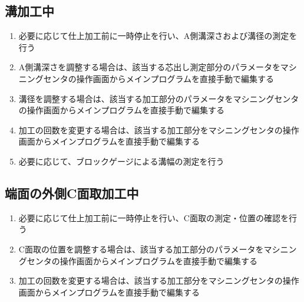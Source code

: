 \subsection{溝加工中}
\begin{enumerate}
\item 必要に応じて仕上加工前に一時停止を行い、A側溝深さおよび溝径の測定を行う
\item A側溝深さを調整する場合は、該当する芯出し測定部分のパラメータをマシニングセンタの操作画面からメインプログラムを直接手動で編集する
\item 溝径を調整する場合は、該当する加工部分のパラメータをマシニングセンタの操作画面からメインプログラムを直接手動で編集する
\item {}加工の回数を変更する場合は、該当する加工部分をマシニングセンタの操作画面からメインプログラムを直接手動で編集する
\item 必要に応じて、ブロックゲージによる溝幅の測定を行う
\end{enumerate}


\subsection{端面の外側C面取加工中}
\begin{enumerate}
\item 必要に応じて仕上加工前に一時停止を行い、C面取の測定・位置の確認を行う
\item C面取の位置を調整する場合は、該当する加工部分のパラメータをマシニングセンタの操作画面からメインプログラムを直接手動で編集する
\item {}加工の回数を変更する場合は、該当する加工部分をマシニングセンタの操作画面からメインプログラムを直接手動で編集する
\end{enumerate}


\clearpage
